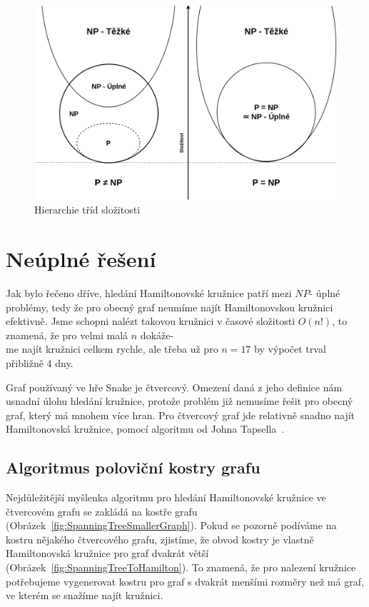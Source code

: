 \begin{figure}[!ht]
    \centering
    \includegraphics[width = 12cm]{Images/HierarchieProblemTrid.png}
    \caption{Hierarchie tříd složitosti}
    \label{fig:HierarchieProblemTrid}
\end{figure}

\section{Neúplné řešení}
Jak bylo řečeno dříve, hledání Hamiltonovské kružnice patří mezi \(NP\)- úplné problémy, tedy že pro obecný graf neumíme najít Hamiltonovskou kružnici efektivně. Jsme schopni nalézt takovou kružnici v časové složitosti \(O(n!)\), to znamená, že pro velmi malá \(n\) dokáže-\\me najít kružnici celkem rychle, ale třeba už pro \(n = 17\) by výpočet trval přibližně 4 dny. 

Graf používaný ve hře Snake je čtvercový. Omezení daná z jeho definice nám usnadní úlohu hledání kružnice, protože problém již nemusíme řešit pro obecný graf, který má mnohem více hran. Pro čtvercový graf jde relativně snadno najít Hamiltonovská kružnice, pomocí algoritmu od Johna Tapsella~\cite{tapsell2025snake}.

\subsection{Algoritmus poloviční kostry grafu}

Nejdůležitější myšlenka algoritmu pro hledání Hamiltonovské kružnice ve čtvercovém grafu se zakládá na kostře grafu (Obrázek~\ref{fig:SpanningTreeSmallerGraph}). Pokud se pozorně podíváme na kostru nějakého čtvercového grafu, zjistíme, že obvod kostry je vlastně Hamiltonovská kružnice pro graf dvakrát větší (Obrázek~\ref{fig:SpanningTreeToHamilton}). To znamená, že pro nalezení kružnice potřebujeme vygenerovat kostru pro graf s dvakrát menšími rozměry než má graf, ve kterém se snažíme najít kružnici. 

